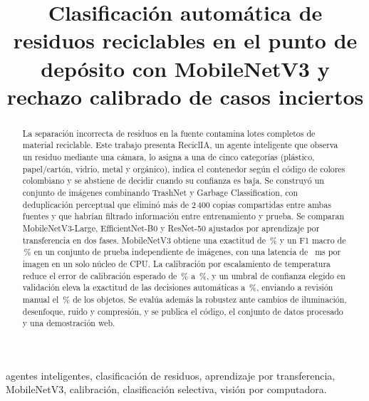 \documentclass[conference,a4paper]{IEEEtran}
\begin{document}
\title{Clasificación automática de residuos reciclables en el punto de depósito con MobileNetV3 y rechazo calibrado de casos inciertos}

\author{
\and
{}
}

\maketitle

\begin{abstract}
La separación incorrecta de residuos en la fuente contamina lotes completos de material reciclable. Este trabajo presenta ReciclIA, un agente inteligente que observa un residuo mediante una cámara, lo asigna a una de cinco categorías (plástico, papel/cartón, vidrio, metal y orgánico), indica el contenedor según el código de colores colombiano y se abstiene de decidir cuando su confianza es baja. Se construyó un conjunto de \nTotal{} imágenes combinando TrashNet y Garbage Classification, con deduplicación perceptual que eliminó más de 2\,400 copias compartidas entre ambas fuentes y que habrían filtrado información entre entrenamiento y prueba. Se comparan MobileNetV3-Large, EfficientNet-B0 y ResNet-50 ajustados por aprendizaje por transferencia en dos fases. MobileNetV3 obtiene una exactitud de \accMN\,\% y un F1 macro de \fMN\,\% en un conjunto de prueba independiente de \nTest{} imágenes, con una latencia de \latUnoMN~ms por imagen en un solo núcleo de CPU. La calibración por escalamiento de temperatura reduce el error de calibración esperado de \eceRawMN\,\% a \eceCalMN\,\%, y un umbral de confianza elegido en validación eleva la exactitud de las decisiones automáticas a \accSelMN\,\%, enviando a revisión manual el \rechMN\,\% de los objetos. Se evalúa además la robustez ante cambios de iluminación, desenfoque, ruido y compresión, y se publica el código, el conjunto de datos procesado y una demostración web.
\end{abstract}

\begin{IEEEkeywords}
agentes inteligentes, clasificación de residuos, aprendizaje por transferencia, MobileNetV3, calibración, clasificación selectiva, visión por computadora.
\end{IEEEkeywords}
\end{document}
